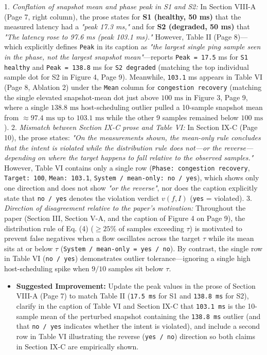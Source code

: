 \documentclass[11pt,a4paper]{article}
\begin{document}
1. \emph{Conflation of snapshot mean and phase peak in S1 and S2:} In Section VIII-A (Page 7, right column), the prose states for \textbf{S1 (healthy, 50 ms)} that the measured latency had a \emph{"peak 17.3 ms,"} and for \textbf{S2 (degraded, 50 ms)} that \emph{"The latency rose to 97.6 ms (peak 103.1 ms)."} However, Table II (Page 8)—which explicitly defines \texttt{Peak} in its caption as \emph{"the largest single ping sample seen in the phase, not the largest snapshot mean"}—reports \texttt{Peak = 17.5} ms for \texttt{S1 healthy} and \texttt{Peak = 138.8} ms for \texttt{S2 degraded} (matching the top individual sample dot for S2 in Figure 4, Page 9). Meanwhile, \texttt{103.1} ms appears in Table VI (Page 8, Ablation 2) under the \texttt{Mean} column for \texttt{congestion recovery} (matching the single elevated snapshot-mean dot just above $100\text{ ms}$ in Figure 3, Page 9, where a single $138.8\text{ ms}$ host-scheduling outlier pulled a 10-sample snapshot mean from $\approx 97.4\text{ ms}$ up to $103.1\text{ ms}$ while the other 9 samples remained below $100\text{ ms}$).
2. \emph{Mismatch between Section IX-C prose and Table VI:} In Section IX-C (Page 10), the prose states: \emph{"On the measurements shown, the mean-only rule concludes that the intent is violated while the distribution rule does not—or the reverse—depending on where the target happens to fall relative to the observed samples."} However, Table VI contains only a single row (\texttt{Phase: congestion recovery}, \texttt{Target: 100}, \texttt{Mean: 103.1}, \texttt{System / mean-only: no / yes}), which shows only one direction and does not show \emph{"or the reverse"}, nor does the caption explicitly state that \texttt{no / yes} denotes the violation verdict $v(f, I)$ (\texttt{yes} = violated).
3. \emph{Direction of disagreement relative to the paper's motivation:} Throughout the paper (Section III, Section V-A, and the caption of Figure 4 on Page 9), the distribution rule of Eq. (4) ($\ge 25\%$ of samples exceeding $\tau$) is motivated to prevent false negatives when a flow oscillates across the target $\tau$ while its mean sits at or below $\tau$ (\texttt{System / mean-only = yes / no}). By contrast, the single row in Table VI (\texttt{no / yes}) demonstrates outlier tolerance—ignoring a single high host-scheduling spike when $9/10$ samples sit below $\tau$.
\begin{itemize}[leftmargin=1.8em,itemsep=2pt]
\item \textbf{Suggested Improvement:} Update the peak values in the prose of Section VIII-A (Page 7) to match Table II (\texttt{17.5 ms} for S1 and \texttt{138.8 ms} for S2), clarify in the caption of Table VI and Section IX-C that \texttt{103.1 ms} is the 10-sample mean of the perturbed snapshot containing the \texttt{138.8 ms} outlier (and that \texttt{no / yes} indicates whether the intent is violated), and include a second row in Table VI illustrating the reverse (\texttt{yes / no}) direction so both claims in Section IX-C are empirically shown.
\end{itemize}
\end{document}
